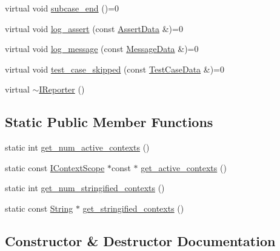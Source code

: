\begin{DoxyCompactItemize}
\item 
virtual void \mbox{\hyperlink{structdoctest_1_1_i_reporter_a05196dd1a5f7e40e8c734cd2a37d4e1e}{subcase\+\_\+end}} ()=0
\item 
virtual void \mbox{\hyperlink{structdoctest_1_1_i_reporter_a5bb54923eab233bb02f2fcfc178fa12a}{log\+\_\+assert}} (const \mbox{\hyperlink{structdoctest_1_1_assert_data}{Assert\+Data}} \&)=0
\item 
virtual void \mbox{\hyperlink{structdoctest_1_1_i_reporter_a2b2cb4f15aa7417d4903a0edc3147018}{log\+\_\+message}} (const \mbox{\hyperlink{structdoctest_1_1_message_data}{Message\+Data}} \&)=0
\item 
virtual void \mbox{\hyperlink{structdoctest_1_1_i_reporter_ab4ecfea9cd9582aad4a5e90e0c8ba45d}{test\+\_\+case\+\_\+skipped}} (const \mbox{\hyperlink{structdoctest_1_1_test_case_data}{Test\+Case\+Data}} \&)=0
\item 
virtual \mbox{\hyperlink{structdoctest_1_1_i_reporter_ae772182e42f2a3b163497f2b8bc3636d}{$\sim$\+I\+Reporter}} ()
\end{DoxyCompactItemize}
\subsection*{Static Public Member Functions}
\begin{DoxyCompactItemize}
\item 
static int \mbox{\hyperlink{structdoctest_1_1_i_reporter_a7d520de46d9104c0eeb02375fabad32d}{get\+\_\+num\+\_\+active\+\_\+contexts}} ()
\item 
static const \mbox{\hyperlink{structdoctest_1_1_i_context_scope}{I\+Context\+Scope}} $\ast$const  $\ast$ \mbox{\hyperlink{structdoctest_1_1_i_reporter_a67a2da62d754d3b517d6d50ef210a988}{get\+\_\+active\+\_\+contexts}} ()
\item 
static int \mbox{\hyperlink{structdoctest_1_1_i_reporter_ac8b96fef046edc609a3374a61b84797d}{get\+\_\+num\+\_\+stringified\+\_\+contexts}} ()
\item 
static const \mbox{\hyperlink{classdoctest_1_1_string}{String}} $\ast$ \mbox{\hyperlink{structdoctest_1_1_i_reporter_acc1a86891876a957c6fc382af7894f99}{get\+\_\+stringified\+\_\+contexts}} ()
\end{DoxyCompactItemize}


\subsection{Constructor \& Destructor Documentation}
\mbox{\label{structdoctest_1_1_i_reporter_ae772182e42f2a3b163497f2b8bc3636d}} 
